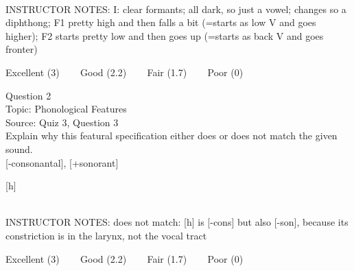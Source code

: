 \documentclass[12pt]{article}
\begin{document}
~\\
INSTRUCTOR NOTES: I: clear formants; all dark, so just a vowel; changes so a diphthong; F1 pretty high and then falls a bit (=starts as low V and goes higher); F2 starts pretty low and then goes up (=starts as back V and goes fronter)


\vfill
Excellent (3) ~~~ Good (2.2) ~~~ Fair (1.7) ~~~ Poor (0)
\newpage

{\large Question 2}\\

Topic: Phonological Features\\
Source: Quiz 3, Question 3\\

Explain why this featural specification either does or does not match the given sound.\\

{[-consonantal]}, {[+sonorant]}

{[h]}


~\\
INSTRUCTOR NOTES: does not match: [h] is [-cons] but also [-son], because its constriction is in the larynx, not the vocal tract


\vfill
Excellent (3) ~~~ Good (2.2) ~~~ Fair (1.7) ~~~ Poor (0)
\newpage

\begin{center}
\textbf{{\color{red}{\HUGE END OF EXAM}}}\\

\end{center}
\newpage
\end{document}
